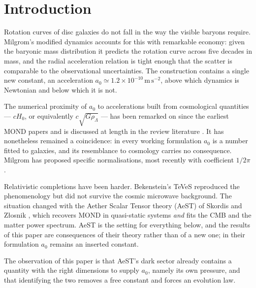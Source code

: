 \documentclass[aps,prd,twocolumn,superscriptaddress,nofootinbib,floatfix]{revtex4-2}
\newcommand{\azero}{a_{0}}
\begin{document}
\maketitle

\section{Introduction}

Rotation curves of disc galaxies do not fall in the way the visible baryons require. Milgrom's
modified dynamics \cite{Milgrom1983} accounts for this with remarkable economy: given the
baryonic mass distribution it predicts the rotation curve across five decades in mass, and the
radial acceleration relation \cite{McGaugh2016} is tight enough that the scatter is comparable
to the observational uncertainties. The construction contains a single new constant, an
acceleration $\azero \simeq 1.2\times10^{-10}\,\mathrm{m\,s^{-2}}$, above which dynamics is
Newtonian and below which it is not.

The numerical proximity of $\azero$ to accelerations built from cosmological quantities ---
$cH_{0}$, or equivalently $c\sqrt{G\rho_{\Lambda}}$ --- has been remarked on since the earliest
MOND papers and is discussed at length in the review literature \cite{FamaeyMcGaugh2012}. It has
nonetheless remained a coincidence: in every working formulation $\azero$ is a number fitted to
galaxies, and its resemblance to cosmology carries no consequence. Milgrom has proposed specific
normalisations, most recently with coefficient $1/2\pi$ \cite{Milgrom2020}.

Relativistic completions have been harder. Bekenstein's TeVeS \cite{Bekenstein2004} reproduced
the phenomenology but did not survive the cosmic microwave background. The situation changed with
the Aether Scalar Tensor theory (AeST) of Skordis and Z\l osnik \cite{SkordisZlosnik2021}, which
recovers MOND in quasi-static systems \emph{and} fits the CMB and the matter power spectrum. AeST
is the setting for everything below, and the results of this paper are consequences of their
theory rather than of a new one; in their formulation $\azero$ remains an inserted constant.

The observation of this paper is that AeST's dark sector already contains a quantity with the
right dimensions to supply $\azero$, namely its own pressure, and that identifying the two
removes a free constant and forces an evolution law.
\end{document}
